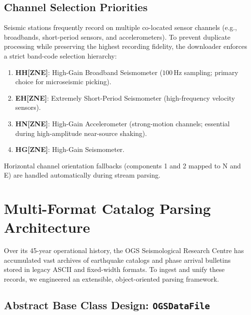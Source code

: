 \subsection{Channel Selection Priorities}
\label{subsec:channel_priorities}

Seismic stations frequently record on multiple co-located sensor channels (e.g., broadbands, short-period sensors, and accelerometers). To prevent duplicate processing while preserving the highest recording fidelity, the downloader enforces a strict band-code selection hierarchy:
\begin{enumerate}
  \item \textbf{HH[ZNE]}: High-Gain Broadband Seismometer ($100\,\mathrm{Hz}$ sampling; primary choice for microseismic picking).
  \item \textbf{EH[ZNE]}: Extremely Short-Period Seismometer (high-frequency velocity sensors).
  \item \textbf{HN[ZNE]}: High-Gain Accelerometer (strong-motion channels; essential during high-amplitude near-source shaking).
  \item \textbf{HG[ZNE]}: High-Gain Seismometer.
\end{enumerate}
Horizontal channel orientation fallbacks (components 1 and 2 mapped to N and E) are handled automatically during stream parsing.

\section{Multi-Format Catalog Parsing Architecture}
\label{sec:catalog_parsing}

Over its 45-year operational history, the OGS Seismological Research Centre has accumulated vast archives of earthquake catalogs and phase arrival bulletins stored in legacy ASCII and fixed-width formats. To ingest and unify these records, we engineered an extensible, object-oriented parsing framework.

\subsection{Abstract Base Class Design: \texttt{OGSDataFile}}
\label{subsec:ogsdatafile}

